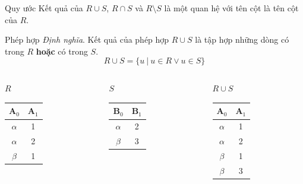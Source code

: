 \documentclass[11pt, handout]{beamer}
\begin{document}
  \begin{frame}{Quy ước}
    Kết quả của $R \cup S$, $R \cap S$ và $R \setminus S$ là một quan hệ với tên cột là tên cột của $R$.
  \end{frame}
  \begin{frame}{Phép hợp}
    \textit{Định nghĩa}. Kết quả của phép hợp $R \cup S$ là tập hợp những dòng có trong $R$ \textbf{hoặc} có trong $S$.
    $$R \cup S = \{u\ |\ u \in R \vee u \in S\}$$
  \end{frame}
  \begin{frame}
    \begin{columns}[T]
      \begin{column}{0.3\textwidth}
        \centering $R$
        \medskip \\
        \begin{tabular}{|c|c|}
          \hline
          $\textbf{A}_0$ & $\textbf{A}_1$ \\[0.5ex] \hline\hline
          $\alpha$ & 1 \\ \hline
          $\alpha$ & 2 \\ \hline
          $\beta$ & 1 \\ \hline
        \end{tabular}
      \end{column}
      \begin{column}{0.3\textwidth}
        \centering $S$
        \medskip \\
        \begin{tabular}{|c|c|}
          \hline
          $\textbf{B}_0$ & $\textbf{B}_1$ \\[0.5ex] \hline\hline
          $\alpha$ & 2 \\ \hline
          $\beta$ & 3 \\ \hline
        \end{tabular}
      \end{column}
      \begin{column}{0.3\textwidth}
        \centering $R \cup S$
        \medskip \\
        \begin{tabular}{|c|c|}
          \hline
          $\textbf{A}_0$ & $\textbf{A}_1$ \\[0.5ex] \hline\hline
          $\alpha$ & 1 \\ \hline
          $\alpha$ & 2 \\ \hline
          $\beta$ & 1 \\ \hline
          $\beta$ & 3 \\ \hline
        \end{tabular}
      \end{column}
    \end{columns}
  \end{frame}
\end{document}
